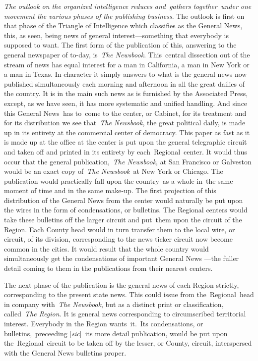 \documentclass[openany,nobib]{tufte-book}
\begin{document}
\emph{The outlook on the organized intelligence reduces and~gathers
together~under one movement the various phases of the publishing
business}. The outlook is first on that phase of the Triangle of
Intelligence which classifies as the General News, this, as seen, being
news of general interest---something that everybody is supposed to want.
The first form of the publication of this, answering to the general
newspaper of to-day, is~\emph{The Newsbook}. This~central dissection out
of the stream of news has equal interest for a man in California, a man
in New York or a man in Texas. In character it simply answers to what is
the general news now published simultaneously each morning and afternoon
in all the great dailies of the country. It is in the main such news as
is furnished by the Associated Press, except, as we have seen, it has
more systematic and unified handling. And since this General News~has
to~come to the center, or Cabinet, for its treatment and for its
distribution we see that~\emph{The Newsbook}, the great political daily,
is made up in its entirety at the commercial center of democracy. This
paper as fast as it is made up at the office at the center is put upon
the general telegraphic circuit and taken off and printed in its
entirety by each~Regional~center. It would thus occur that the general
publication,~\emph{The Newsbook}, at San Francisco or Galveston would be
an exact copy of~\emph{The Newsbook}~at New York or Chicago. The
publication would practically fall upon the country~as a whole in~the
same moment of time and in the same make-up. The first projection of
this distribution of the General News from the center would naturally be
put upon the wires in the form of condensations, or bulletins. The
Regional centers would take these bulletins off the larger circuit and
put~them upon the circuit of the Region. Each County head would in turn
transfer them to the local wire, or circuit, of its division,
corresponding to the news ticker circuit now become common in the
cities. It would result that the whole country would simultaneously get
the condensations of important General News ---the fuller detail coming
to them in the publications from their nearest centers.~

The next phase of the publication is the general news of each Region
strictly, corresponding to the present state news. This could issue from
the~Regional~head in company with~\emph{The Newsbook}, but as a distinct
print or classification, called~\emph{The Region}. It is general news
corresponding to circumscribed territorial interest. Everybody in the
Region wants~it.~Its condensations, or bulletins,~preceeding
{[}\emph{sic}{]}~its more detail publication, would be put upon
the~Regional~circuit to be taken off by the lesser, or County, circuit,
interspersed with the General News bulletins proper.~
\end{document}

